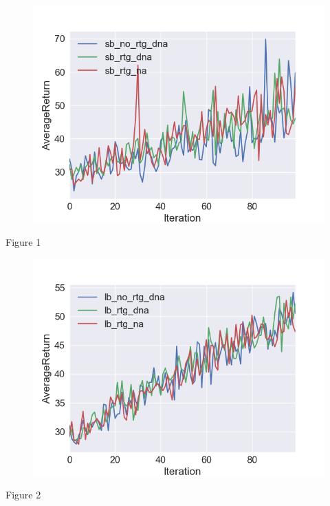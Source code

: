 \documentclass[10pt]{article}
\makeatletter
\def\maxwidth{\ifdim\Gin@nat@width>\linewidth\linewidth
\else\Gin@nat@width\fi}
\let\Oldincludegraphics\includegraphics
\renewcommand{\includegraphics}[1]{\Oldincludegraphics[width=\maxwidth]{#1}}
\makeatother
\begin{document}
\begin{figure}
\centering
\includegraphics{Images/graph_small_batch.png}
\caption{}
\end{figure}

Figure 1

\begin{figure}
\centering
\includegraphics{Images/graph_large_batch.png}
\caption{}
\end{figure}

Figure 2
\end{document}
